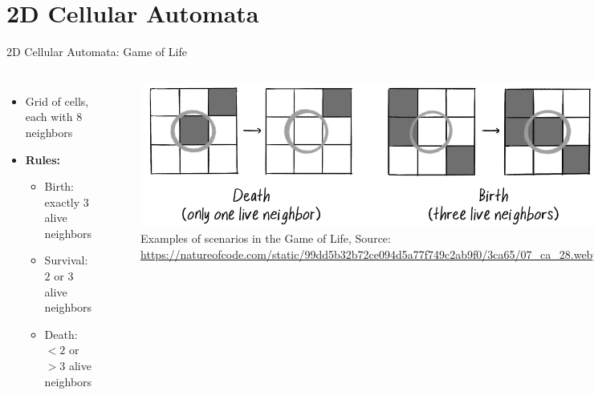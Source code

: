 \section{2D Cellular Automata}
\begin{frame}{2D Cellular Automata: Game of Life}
    \begin{columns}
        \begin{itemize}
            \item Grid of cells, each with $8$ neighbors
            \item \textbf{Rules:}
                  \begin{itemize}
                      \item Birth: exactly $3$ alive neighbors
                      \item Survival: $2$ or $3$ alive neighbors
                      \item Death: $<2$ or $>3$ alive neighbors
                  \end{itemize}
        \end{itemize}
        \begin{figure}
            \centering
            \includegraphics[width=\textwidth]{../paper/figures/game_of_life_examples}
            \caption{Examples of scenarios in the Game of Life, Source: \url{https://natureofcode.com/static/99dd5b32b72ce094d5a77f749c2ab9f0/3ca65/07_ca_28.webp}}
        \end{figure}
    \end{columns}

\end{frame}


